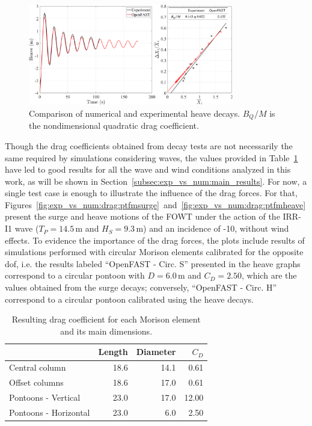\begin{figure}[!hbtp]
	\centering
	\includegraphics[width=0.80\textwidth]{./figures/heave_decay_drag_pontoon.png}%
	\caption{Comparison of numerical and experimental heave decays. $B_Q/M$ is the nondimensional quadratic drag coefficient.} \label{fig:exp_vs_num:drag:heave_decay}%
\end{figure}%

Though the drag coefficients obtained from decay tests are not necessarily the same required by simulations considering waves, the values provided in Table~\ref{tab:exp_vs_num:drag:drag_coeffs} have led to good results for all the wave and wind conditions analyzed in this work, as will be shown in Section~\ref{subsec:exp_vs_num:main_results}. For now, a single test case is enough to illustrate the influence of the drag forces. For that, Figures~\ref{fig:exp_vs_num:drag:ptfmsurge}~and~\ref{fig:exp_vs_num:drag:ptfmheave} present the surge and heave motions of the FOWT under the action of the IRR-I1 wave ($T_P=14.5\,\text{m}$ and $H_S=9.3\,\text{m}$) and an incidence of -10\textdegree{}, without wind effects. To evidence the importance of the drag forces, the plots include results of simulations performed with circular Morison elements calibrated for the opposite dof, i.e. the results labeled \enquote{OpenFAST - Circ. S} presented in the heave graphs correspond to a circular pontoon with $D=6.0\,\text{m}$ and $C_D=2.50$, which are the values obtained from the surge decays; conversely, \enquote{OpenFAST - Circ. H} correspond to a circular pontoon calibrated using the heave decays.
\begin{table}[!hbtp]
	\caption{Resulting drag coefficient for each Morison element and its main dimensions.}\label{tab:exp_vs_num:drag:drag_coeffs}
	\begin{tabular}{lrrr}
		\toprule
		& Length & Diameter & $C_D$ \\
		\midrule
		Central column & 18.6 & 14.1 & 0.61 \\
		Offset columns & 18.6 & 17.0 & 0.61 \\
		Pontoons - Vertical & 23.0 & 17.0 & 12.00 \\
		Pontoons - Horizontal & 23.0 & 6.0 & 2.50 \\
		\bottomrule%
\end{tabular}%
\end{table}%

